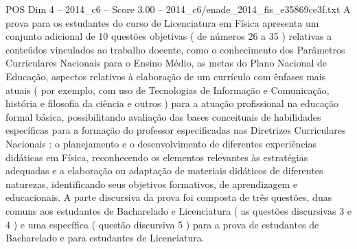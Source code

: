 \begin{textsample}{POS Dim 4 – 2014\_c6 – Score 3.00 – 2014\_c6/enade\_2014\_fis\_e35869ce3f.txt}
A prova para os estudantes do curso de Licenciatura em Física apresenta um conjunto adicional de 10 questões objetivas ( de números 26 a 35 ) relativas a conteúdos vinculados ao trabalho docente, como o conhecimento dos Parâmetros Curriculares Nacionais para o Ensino Médio, as metas do Plano Nacional de Educação, aspectos relativos à elaboração de um currículo com ênfases mais atuais ( por exemplo, com uso de Tecnologias de Informação e Comunicação, história e filosofia da ciência e outros ) para a atuação profissional na educação formal básica, possibilitando avaliação das bases conceituais de habilidades específicas para a formação do professor especificadas nas Diretrizes Curriculares Nacionais : o planejamento e o desenvolvimento de diferentes experiências didáticas em Física, reconhecendo os elementos relevantes às estratégias adequadas e a elaboração ou adaptação de materiais didáticos de diferentes naturezas, identificando seus objetivos formativos, de aprendizagem e educacionais.
A parte discursiva da prova foi composta de três questões, duas comuns aos estudantes de Bacharelado e Licenciatura ( as questões discursivas 3 e 4 ) e uma específica ( questão discursiva 5 ) para a prova de estudantes de Bacharelado e para estudantes de Licenciatura.

\end{textsample}
